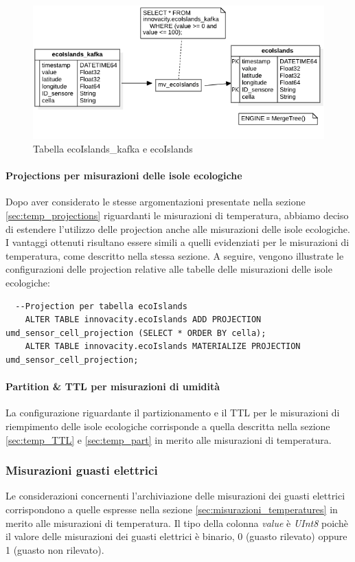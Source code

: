 \begin{figure}[H]
	\centering
	\includegraphics[width=1\textwidth]{../Images/SpecificaTecnica/ecoIslands.png}
	\caption{Tabella ecoIslands\_kafka e ecoIslands}
	\label{fig:ecoIslands_tables}
\end{figure}

\paragraph{Projections per misurazioni delle isole ecologiche} 
Dopo aver considerato le stesse argomentazioni presentate nella sezione \ref{sec:temp_projections} riguardanti le misurazioni di temperatura, abbiamo deciso di estendere l'utilizzo delle projection anche alle misurazioni delle isole ecologiche. I vantaggi ottenuti risultano essere simili a quelli evidenziati per le misurazioni di temperatura, come descritto nella stessa sezione. A seguire, vengono illustrate le configurazioni delle projection relative alle tabelle delle misurazioni delle isole ecologiche:

\begin{lstlisting}
  --Projection per tabella ecoIslands
	ALTER TABLE innovacity.ecoIslands ADD PROJECTION umd_sensor_cell_projection (SELECT * ORDER BY cella);
	ALTER TABLE innovacity.ecoIslands MATERIALIZE PROJECTION umd_sensor_cell_projection;
\end{lstlisting}

\paragraph{Partition \& TTL per misurazioni di umidità}
La configurazione riguardante il partizionamento e il TTL per le misurazioni di riempimento delle isole ecologiche corrisponde a quella descritta nella sezione \ref{sec:temp_TTL} e \ref{sec:temp_part} in merito alle misurazioni di temperatura.


\subsubsection{Misurazioni guasti elettrici} \label{sec:tab_guasti}
Le considerazioni concernenti l'archiviazione delle misurazioni dei guasti elettrici corrispondono a quelle espresse nella sezione \ref{sec:misurazioni_temperatures} in merito alle misurazioni di temperatura.
Il tipo della colonna \textit{value} è \textit{UInt8} poichè il valore delle misurazioni dei guasti elettrici è binario, 0 (guasto rilevato) oppure 1 (guasto non rilevato).

